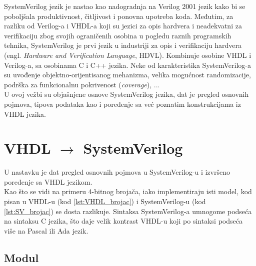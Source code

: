 %
% 

SystemVerilog jezik je nastao kao nadogradnja na Verilog 2001 jezik kako bi se
poboljšala produktivnost, čitljivost i ponovna upotreba koda.
Međutim, za razliku od Verilog-a i VHDL-a koji su jezici za opis hardvera i
neadekvatni za verifikaciju zbog svojih ograničenih osobina u pogledu raznih
programskih tehnika, SystemVerilog je prvi jezik u industriji za opis i
verifikaciju hardvera (engl. \emph{Hardware and Verification Language}, HDVL).
Kombinuje osobine VHDL i Verilog-a, sa osobinama C i C++ jezika. Neke od
karakteristika SystemVerilog-a su uvođenje objektno-orijentisanog mehanizma,
velika mogućnost randomizacije, podrška za funkcionalnu pokrivenost
(\emph{coverage}), ...\\

U ovoj vežbi su objašnjene osnove SystemVerilog jezika, dat je pregled osnovnih
pojmova, tipova podataka kao i poređenje sa već poznatim konstrukcijama iz VHDL
jezika.


\section{VHDL \(\rightarrow\) SystemVerilog}

U nastavku je dat pregled osnovnih pojmova u SystemVerilog-u i izvršeno
poređenje sa VHDL jezikom.\\

Kao što se vidi na primeru 4-bitnog brojača, iako implementiraju isti model, kod
pisan u VHDL-u (kod \ref{lst:VHDL_brojac}) i SystemVerilog-u (kod
\ref{lst:SV_brojac}) se dosta razlikuje.
Sintaksa SystemVerilog-a umnogome podseća na sintaksu C jezika, što daje velik
kontrast VHDL-u koji po sintaksi podseća više na Pascal ili Ada jezik.





\subsection{Modul}

